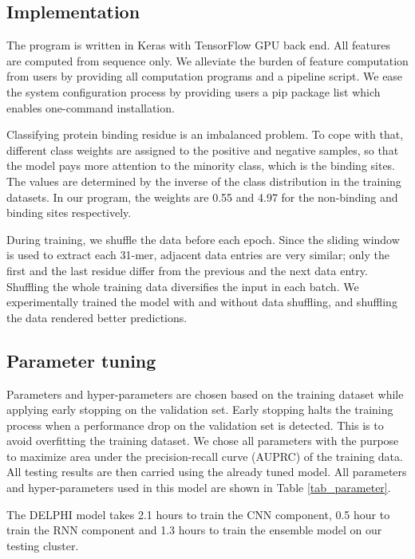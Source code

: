 \documentclass{bioinfo}
\begin{document}
\begin{methods}
\subsection{Implementation}
The program is written in Keras \citep{chollet2015keras} with TensorFlow GPU \citep{tensorflow2015-whitepaper} back end. All features are computed from sequence only. We alleviate the burden of feature computation from users by providing all computation programs and a pipeline script. We ease the system configuration process by providing users a pip package list which enables one-command installation. 

Classifying protein binding residue is an imbalanced problem. To cope with that, different class weights \citep{ting2002instance} are assigned to the positive and negative samples, so that the model pays more attention to the minority class, which is the binding sites.  The values are determined by the inverse of the class distribution in the training datasets. In our program, the weights are 0.55 and 4.97 for the non-binding and binding sites respectively. 

During training, we shuffle the data before each epoch. Since the sliding window is used to extract each 31-mer, adjacent data entries are very similar; only the first and the last residue differ from the previous and the next data entry. Shuffling the whole training data diversifies the input in each batch. We experimentally trained the model with and without data shuffling, and shuffling the data rendered better predictions. 

\subsection{Parameter tuning}
Parameters and hyper-parameters are chosen based on the training dataset while applying early stopping \citep{prechelt1998early} on the validation set. Early stopping halts the training process when a performance drop on the validation set is detected. This is to avoid overfitting the training dataset. We chose all parameters with the purpose to maximize area under the precision-recall curve (AUPRC) of the training data. All testing results are then carried using the already tuned model. All parameters and hyper-parameters used in this model are shown in Table \ref{tab_parameter}. 

The DELPHI model takes 2.1 hours to train the CNN component, 0.5 hour to train the RNN component and 1.3 hours to train the ensemble model on our testing cluster.


\end{methods}
\end{document}
